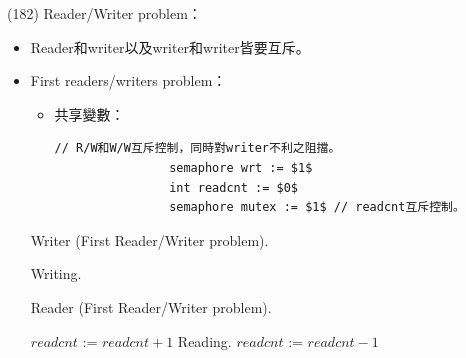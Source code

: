 \begin{theorem}{(182)} Reader/Writer problem：\begin{itemize}
        \item Reader和writer以及writer和writer皆要互斥。
        \item First readers/writers problem：\begin{itemize}
            \item 共享變數：\begin{lstlisting}[caption={Shared variables of First Reader/Writer problem.}, captionpos=b, mathescape=true]
                // R/W和W/W互斥控制，同時對writer不利之阻擋。
                semaphore wrt := $1$ 
                int readcnt := $0$
                semaphore mutex := $1$ // readcnt互斥控制。
            \end{lstlisting}
        \end{itemize}
        \begin{algorithm}[H]
            \caption{Writer (First Reader/Writer problem).}
            \begin{algorithmic}[1]
                    \Repeat
                        \State {}
                        \State Writing.
                        \State {}
                \EndFunction
            \end{algorithmic}
        \end{algorithm}
        \begin{algorithm}[H]
            \caption{Reader (First Reader/Writer problem).}
            \begin{algorithmic}[1]
                    \Repeat
                        \State {}
                        \State $readcnt$ := $readcnt + 1$
                         
                            \State {} 
                        \EndIf
                        \State {} 
                        \State Reading.
                        \State {}
                        \State $readcnt$ := $readcnt - 1$
                         
                            \State {} 
                        \EndIf
                        \State {}
                \EndFunction
            \end{algorithmic}

\end{algorithm}
\end{itemize}
\end{theorem}
